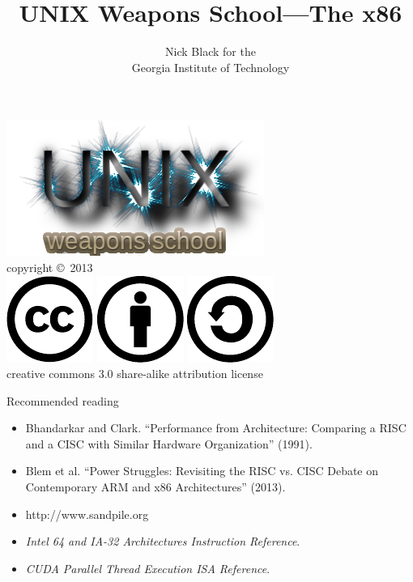 \documentclass[xcolor={dvipsnames,table}]{beamer}
\title{UNIX Weapons School---The x86}
\date{}
\author{Nick Black for the\\
Georgia Institute of Technology
}
\begin{document}
\begin{frame}
\titlepage
\begin{center}
\includegraphics[scale=0.33]{images/uws.png}\\
\vspace{.1in}
\tiny{copyright \copyright\ 2013}\\
\includegraphics[scale=.25]{images/cc-logo.pdf}
\includegraphics[scale=.25]{images/cc-new.pdf}
\includegraphics[scale=.25]{images/cc-share.pdf}\\
\tiny{creative commons 3.0 share-alike attribution license}
\end{center}
\end{frame}

\begin{frame}{Recommended reading}
\begin{itemize}
\small
\item Bhandarkar and Clark. ``Performance from Architecture: Comparing a
   RISC and a CISC with Similar Hardware Organization'' (1991).
\vfill
\item Blem et al. ``Power Struggles: Revisiting the RISC vs. CISC Debate on
   Contemporary ARM and x86 Architectures'' (2013).
\vfill
\item http://www.sandpile.org
\vfill
\item \textit{Intel 64 and IA-32 Architectures Instruction Reference}.
\vfill
\item \textit{CUDA Parallel Thread Execution ISA Reference}.
\end{itemize}
\end{frame}
\end{document}
